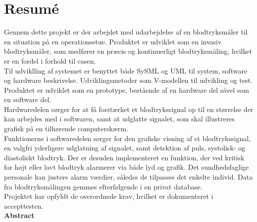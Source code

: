 \chapter{Resumé}
Gennem dette projekt er der arbejdet med udarbejdelse af en blodtryksmåler til en situation på en operationsstue. Produktet er udviklet som en invasiv blodtryksmåler, som medfører en præcis og kontinuerligt blodtryksmåling, hvilket er en fordel i forhold til casen. \\
Til udviklling af systemet er benyttet både SySML og UML til system, software og hardware beskrivelse. Udviklingsmetoder som V-modellen til udvikling og test.\\ 
Produktet er udviklet som en prototype, bestående af en hardware del såvel som en software del.\\[0.5ex]
Hardwaredelen sørger for at få forstærket et blodtrykssignal op til en størrelse der kan arbejdes med i softwaren, samt at udglatte signalet, som skal illustreres grafisk på en tilhørende computerskærm.\\[1ex]
Funktionerne i softwaredelen sørger for den grafiske visning af et blodtrykssignal, en valgfri yderligere udglatning af signalet, samt detektion af puls, systolisk- og diastoliskt blodtryk. Der er desuden implementeret en funktion, der ved kritisk for højt eller lavt blodtryk alarmerer via både lyd og grafik. Det sundhedsfaglige personale kan justere alarm værdier, således de tilpasses det enkelte individ. Data fra blodtryksmålingen gemmes efterfølgende i en privat database.\\[0.5ex]
Projektet har opfyldt de overordnede krav, hvilket er dokumenteret i accepttesten. \\
\textbf{Abstract}\\
\\
